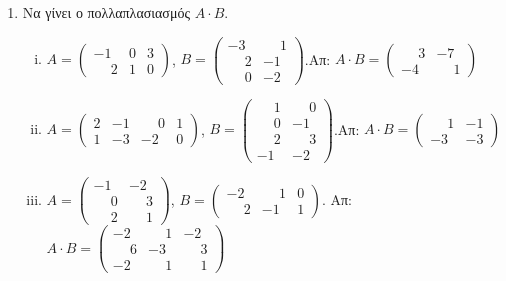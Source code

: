 \documentclass[a4paper,table]{report}
\begin{document}
\begin{center}
  \minibox[c]{\large \bfseries \textcolor{Col1}{Ασκήσεις στον Πολ/σμό Πινάκων} \\
  \large \bfseries \textcolor{Col1}{και στις Ορίζουσες}}
\end{center}

\vspace{\baselineskip}


\begin{enumerate}

\item Να γίνει ο πολλαπλασιασμός $A \cdot B$.

\begin{enumerate}[i)]
    \renewcommand{\itemsep}{10pt}
\item $A=\begin{pmatrix}
-1 & 0 & 3 \\
\phantom{-}2 & 1 & 0 
\end{pmatrix}$,
\quad
$B=\begin{pmatrix}
-3 & \phantom{-}1 \\
\phantom{-}2 & -1 \\ 
\phantom{-}0 & -2
\end{pmatrix}$.\hfill Απ: $A\cdot B = \begin{pmatrix}
\phantom{-}3 & -7 \\
-4 & \phantom{-}1
\end{pmatrix}$

\item $A=\begin{pmatrix}
2 & -1 & \phantom{-}0 & 1 \\
1 & -3 & -2 & 0
\end{pmatrix}$,
\quad
$B=\begin{pmatrix}
\phantom{-}1 & \phantom{-}0 \\
\phantom{-}0 & -1 \\
\phantom{-}2 & \phantom{-}3 \\
-1 & -2 
\end{pmatrix}$.\hfill Απ: $A\cdot B=\begin{pmatrix}
\phantom{-}1 & -1 \\
-3 & -3 
\end{pmatrix}$

\item $A=\begin{pmatrix}
-1 & -2 \\
\phantom{-}0 & \phantom{-}3 \\
\phantom{-}2 & \phantom{-}1 
\end{pmatrix}$,
\quad 
$B=\begin{pmatrix}
-2 & \phantom{-}1 & 0 \\
\phantom{-}2 & -1 & 1 
\end{pmatrix}$. \hfill Απ: $A\cdot B=\begin{pmatrix}
-2 & \phantom{-}1 & -2 \\
\phantom{-}6 & -3 & \phantom{-}3 \\
-2 & \phantom{-}1 & \phantom{-}1 
\end{pmatrix}$


\end{enumerate}
\end{enumerate}
\end{document}
